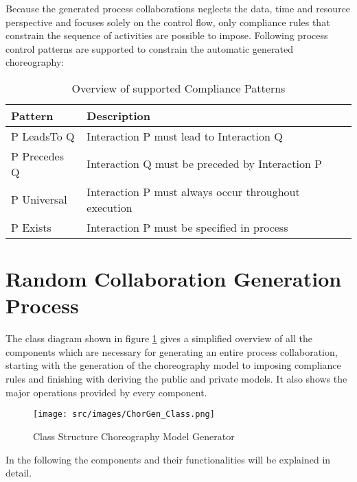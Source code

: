 Because the generated process collaborations neglects the data, time and resource perspective and focuses solely on the control flow, only compliance rules that constrain the sequence of activities are possible to impose. Following process control patterns are supported to constrain the automatic generated choreography:

\begin{table}[H]
\centering
\resizebox{12cm}{!}
{
\begin{tabular}{l|l}
Pattern		      & Description  \\ \hline
P LeadsTo Q       & Interaction P must lead to Interaction Q	  	 \\
P Precedes Q      & Interaction Q must be preceded by Interaction P	  \\
P Universal  	  & Interaction P must always occur throughout execution \\
P Exists		  & Interaction P must be specified in process \\
\end{tabular}%
}
\caption{Overview of supported Compliance Patterns}
\label{tab:compl_patterns}
\end{table}



\section{Random Collaboration Generation Process}

The class diagram shown in figure \ref{fig:choreo_gen_structure} gives a simplified overview of all the components which are necessary for generating an entire process collaboration, starting with the generation of the choreography model to imposing compliance rules and finishing with deriving the public and private models. It also shows the major operations provided by every component. 

\begin{figure}[H]
\texttt{[image: src/images/ChorGen\_Class.png]}
\caption{Class Structure Choreography Model Generator}
\label{fig:choreo_gen_structure}
\end{figure}

In the following the components and their functionalities will be explained in detail.

